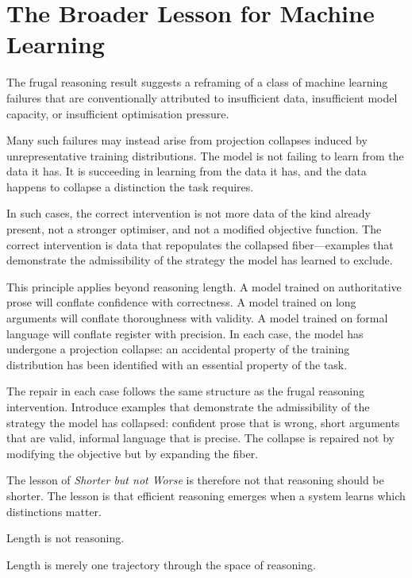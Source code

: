 \documentclass[11pt]{article}
\theoremstyle{rthm}
\theoremstyle{rdef}
\theoremstyle{remark}
\begin{document}
\section{The Broader Lesson for Machine Learning}
\label{sec:lesson}

The frugal reasoning result suggests a reframing of a class of
machine learning failures that are conventionally attributed to
insufficient data, insufficient model capacity, or insufficient
optimisation pressure.

Many such failures may instead arise from projection collapses
induced by unrepresentative training distributions. The model is
not failing to learn from the data it has. It is succeeding in
learning from the data it has, and the data happens to collapse
a distinction the task requires.

In such cases, the correct intervention is not more data of the
kind already present, not a stronger optimiser, and not a modified
objective function. The correct intervention is data that repopulates
the collapsed fiber---examples that demonstrate the admissibility of
the strategy the model has learned to exclude.

This principle applies beyond reasoning length. A model trained
on authoritative prose will conflate confidence with correctness.
A model trained on long arguments will conflate thoroughness with
validity. A model trained on formal language will conflate register
with precision. In each case, the model has undergone a projection
collapse: an accidental property of the training distribution has
been identified with an essential property of the task.

The repair in each case follows the same structure as the frugal
reasoning intervention. Introduce examples that demonstrate the
admissibility of the strategy the model has collapsed: confident
prose that is wrong, short arguments that are valid, informal
language that is precise. The collapse is repaired not by modifying
the objective but by expanding the fiber.

The lesson of \textit{Shorter but not Worse} is therefore not that
reasoning should be shorter. The lesson is that efficient reasoning
emerges when a system learns which distinctions matter.

Length is not reasoning.

Length is merely one trajectory through the space of reasoning.
\end{document}
